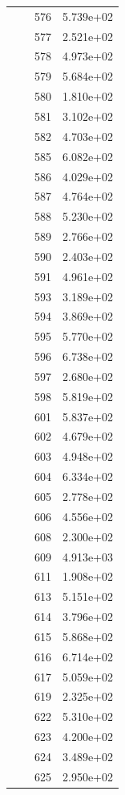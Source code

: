 \documentclass[12pt]{article}
\begin{document}
\begin{longtable}{@{}cccc@{}}
 &  & 576 & 5.739e+02 \\
 &  & 577 & 2.521e+02 \\
 &  & 578 & 4.973e+02 \\
 &  & 579 & 5.684e+02 \\
 &  & 580 & 1.810e+02 \\
 &  & 581 & 3.102e+02 \\
 &  & 582 & 4.703e+02 \\
 &  & 585 & 6.082e+02 \\
 &  & 586 & 4.029e+02 \\
 &  & 587 & 4.764e+02 \\
 &  & 588 & 5.230e+02 \\
 &  & 589 & 2.766e+02 \\
 &  & 590 & 2.403e+02 \\
 &  & 591 & 4.961e+02 \\
 &  & 593 & 3.189e+02 \\
 &  & 594 & 3.869e+02 \\
 &  & 595 & 5.770e+02 \\
 &  & 596 & 6.738e+02 \\
 &  & 597 & 2.680e+02 \\
 &  & 598 & 5.819e+02 \\
 &  & 601 & 5.837e+02 \\
 &  & 602 & 4.679e+02 \\
 &  & 603 & 4.948e+02 \\
 &  & 604 & 6.334e+02 \\
 &  & 605 & 2.778e+02 \\
 &  & 606 & 4.556e+02 \\
 &  & 608 & 2.300e+02 \\
 &  & 609 & 4.913e+03 \\
 &  & 611 & 1.908e+02 \\
 &  & 613 & 5.151e+02 \\
 &  & 614 & 3.796e+02 \\
 &  & 615 & 5.868e+02 \\
 &  & 616 & 6.714e+02 \\
 &  & 617 & 5.059e+02 \\
 &  & 619 & 2.325e+02 \\
 &  & 622 & 5.310e+02 \\
 &  & 623 & 4.200e+02 \\
 &  & 624 & 3.489e+02 \\
 &  & 625 & 2.950e+02 \\

\bottomrule
\end{longtable}
\end{document}
